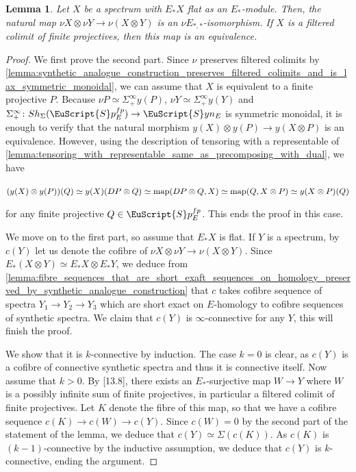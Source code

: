 \documentclass[oneside,a4paper]{amsart}
\newcommand{\euscr}[1]{\EuScript{#1}} %
\newcommand{\map}{\textnormal{map}} %
\newcommand{\spectra}{\euscr{S}p} %
\newcommand{\synspectra}{\euscr{S}yn} %
\newcommand{\sigmainfty}{\Sigma^{\infty}_{+}} %
\theoremstyle{plain}
\newtheorem{lemma}[thm]{Lemma}
\theoremstyle{definition}
\theoremstyle{remark}
\begin{document}
\begin{lemma}
\label{lemma:tensoring_with_a_filtered_colimit_of_finite_projectives_commutes_with_synthetic_analogue_construction}
Let $X$ be a spectrum with $E_{*}X$ flat as an $E_{*}$-module. Then, the natural map $\nu X \otimes \nu Y \rightarrow \nu (X \otimes Y)$ is an $\nu E_{*, *}$-isomorphism. If $X$ is a filtered colimit of finite projectives, then this map is an equivalence. 
\end{lemma}

\begin{proof}
We first prove the second part. Since $\nu$ preserves filtered colimits by \cref{lemma:synthetic_analogue_construction_preserves_filtered_colimits_and_is_lax_symmetric_monoidal}, we can assume that $X$ is equivalent to a finite projective $P$. Because $\nu P \simeq \sigmainfty y(P)$, $\nu Y \simeq \sigmainfty y(Y)$ and $\sigmainfty \colon Sh_{\Sigma}(\spectra_{E}^{fp}) \rightarrow \synspectra_{E}$ is symmetric monoidal, it is enough to verify that the natural morphism $y(X) \otimes y(P) \rightarrow y(X \otimes P)$ is an equivalence. However, using the description of tensoring with a representable of \cref{lemma:tensoring_with_representable_same_as_precomposing_with_dual}, we have 

\begin{center}
$(y(X) \otimes y(P))(Q) \simeq y(X)(DP \otimes Q) \simeq \map(DP \otimes Q, X) \simeq \map(Q, X \otimes P) \simeq y(X \otimes P)(Q)$
\end{center}
for any finite projective $Q \in \spectra_{E}^{fp}$. This ends the proof in this case.

We move on to the first part, so assume that $E_{*}X$ is flat. If $Y$ is a spectrum, by $c(Y)$ let us denote the cofibre of $\nu X \otimes \nu Y \rightarrow \nu (X \otimes Y)$. Since $E_{*}(X \otimes Y) \simeq E_{*} X \otimes E_{*}Y$, we deduce from \cref{lemma:fibre_sequences_that_are_short_exaft_sequences_on_homology_preserved_by_synthetic_analogue_construction} that $c$ takes cofibre sequence of spectra $Y_{1} \rightarrow Y_{2} \rightarrow Y_{3}$ which are short exact on $E$-homology to cofibre sequences of synthetic spectra. We claim that $c(Y)$ is $\infty$-connective for any $Y$, this will finish the proof. 

We show that it is $k$-connective by induction. The case $k = 0$ is clear, as $c(Y)$ is a cofibre of connective synthetic spectra and thus it is connective itself. Now assume that $k > 0$. By \cite{adams1995stable}[13.8], there exists an $E_{*}$-surjective map $W \rightarrow Y$ where $W$ is a possibly infinite sum of finite projectives, in particular a filtered colimit of finite projectives. Let $K$ denote the fibre of this map, so that we have a cofibre sequence $c(K) \rightarrow c(W) \rightarrow c(Y)$. Since $c(W) = 0$ by the second part of the statement of the lemma, we deduce that $c(Y) \simeq \Sigma(c(K))$. As $c(K)$ is $(k-1)$-connective by the inductive assumption, we deduce that $c(Y)$ is $k$-connective, ending the argument. 
\end{proof}
\end{document}
